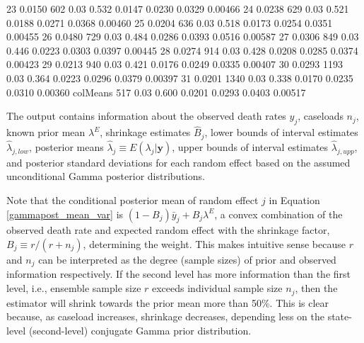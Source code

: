 \documentclass[article]{jss}
\begin{document}
\begin{CodeChunk}
\begin{CodeOutput}
23         0.0150  602       0.03     0.532   0.0147    0.0230   0.0329 0.00466
24         0.0238  629       0.03     0.521   0.0188    0.0271   0.0368 0.00460
25         0.0204  636       0.03     0.518   0.0173    0.0254   0.0351 0.00455
26         0.0480  729       0.03     0.484   0.0286    0.0393   0.0516 0.00587
27         0.0306  849       0.03     0.446   0.0223    0.0303   0.0397 0.00445
28         0.0274  914       0.03     0.428   0.0208    0.0285   0.0374 0.00423
29         0.0213  940       0.03     0.421   0.0176    0.0249   0.0335 0.00407
30         0.0293 1193       0.03     0.364   0.0223    0.0296   0.0379 0.00397
31         0.0201 1340       0.03     0.338   0.0170    0.0235   0.0310 0.00360
colMeans           517       0.03     0.600   0.0201    0.0293   0.0403 0.00517
\end{CodeOutput}
\end{CodeChunk}

The output contains information about the observed death rates $y_{j}$, caseloads $n_{j}$, known prior mean $\lambda^E$, shrinkage estimates $\hat{B}_{j}$, lower bounds of interval estimates $\hat{\lambda}_{j, low}$, posterior means $\hat{\lambda}_j\equiv E(\lambda_{j}\vert \boldsymbol{y})$, upper bounds  of interval estimates $\hat{\lambda}_{j, upp}$, and posterior standard deviations  for each random effect based on the assumed unconditional Gamma posterior distributions. %

Note that the conditional posterior mean of random effect $j$ in Equation \ref{gammapost_mean_var} is $(1-B_{j})\bar{y}_{j} + B_{j}\lambda^E$,  a convex combination of the observed death rate and expected random effect with the shrinkage factor, $B_{j}\equiv r / (r + n_{j})$, determining the weight. This makes intuitive sense because $r$ and $n_{j}$ can be interpreted as the degree (sample sizes) of prior and observed information respectively. If the second level has more information than the first level, i.e., ensemble sample size $r$ exceeds individual sample size $n_{j}$, then the estimator will shrink towards the prior mean more than 50\%. This is clear because, as caseload increases, shrinkage decreases, depending less on the  state-level (second-level) conjugate Gamma prior distribution.
\end{document}
